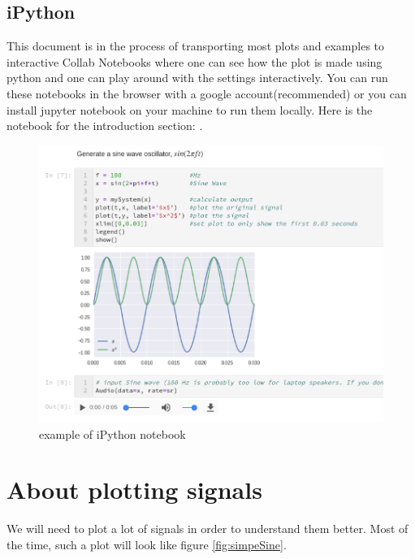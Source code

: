 \subsection{iPython}

This document is in the process of transporting most plots and examples to interactive Collab Notebooks  where one can see how the plot is made using python and one can play around with the settings interactively. You can run these notebooks in the browser with a google account(recommended) or you can install jupyter notebook on your machine to run them locally. Here is the notebook for the introduction section: .

\begin{figure}[H]
	\centering
	\includegraphics[width=\textwidth]{img/notenookExample.png}
	\caption[example of iPython notebook]
	{example of iPython notebook}
	\label{fig:ipython}
\end{figure}


\section{About plotting signals}

We will need to plot a lot of signals in order to understand them better. Most of the time, such a plot will look like figure \ref{fig:simpeSine}.

